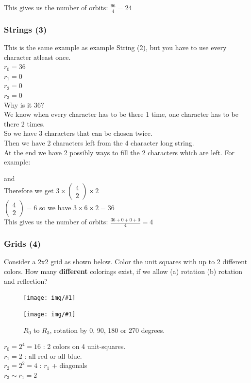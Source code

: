 \documentclass[12pt,onecolumn%
]{scrartcl}
\newcommand{\img}[3]{
\begin{figure}[H]
	\centering
	\texttt{[image: img/\#1]}
	\captionsetup{width=0.8\textwidth, justification=centering}
	\caption{#3}
\end{figure}
}
\newcommand{\imgnc}[2]{
\begin{figure}[H]
	\centering
	\texttt{[image: img/\#1]}
	\captionsetup{width=0.8\textwidth, justification=centering}
\end{figure}
}
\newcommand{\st}[4]{
\boxed{\text{#1}}\boxed{\text{#2}}\boxed{\text{#3}}\boxed{\text{#4}}
}
\begin{document}
{This gives us the number of orbits: $\frac{96}{4} = 24$

\subsubsection{Strings (3)}
This is the same example as example String (2), but you have to use every character atleast once. \\
$r_{0} = 36$\\
$r_{1} = 0$\\
$r_{2} = 0$\\
$r_{3} = 0$\\

Why is it 36?\\
We know when every character has to be there 1 time, one character has to be there 2 times.\\
So we have 3 characters that can be chosen twice.\\
Then we have 2 characters left from the 4 character long string. \\
At the end we have 2 possibly ways to fill the 2 characters which are left. For example:
\st{B}{A}{C}{A} and \st{C}{A}{B}{A} \\

Therefore we get $3 \times\begin{pmatrix}4\\2\end{pmatrix}\times 2$ \\
$\begin{pmatrix}4\\2\end{pmatrix} = 6$ so we have $3 \times 6 \times 2 = 36$\\

This gives us the number of orbits: $\frac{36+0+0+0}{4} = 4$

\subsubsection{Grids (4)}

Consider a 2x2 grid as shown below. Color the unit squares with up to 2 different colors. How many {\bf different} colorings exist, if we allow (a) rotation (b) rotation and reflection?

\imgnc{block_2x2}{trim=140 610 400 120, clip}

\img{block_2x2_rot}{scale=1.1,trim=140 350 335 125, clip}{$R_0$ to $R_3$, rotation by 0, 90, 180 or 270 degrees.}

$r_0 = 2^4 = 16$ : 2 colors on 4 unit-squares. \\
$r_1 = 2$ : all red or all blue. \\
$r_2 = 2^2 = 4$ : $r_1$ + diagonals \\
$r_3 \sim r_1 = 2$

}
\end{document}
